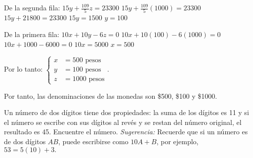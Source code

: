 \begin{myproof}
De la segunda fila: $15y + \frac{109}{5}z = 23300$
$15y + \frac{109}{5}(1000) = 23300$
$15y + 21800 = 23300$
$15y = 1500$
$y = 100$

De la primera fila: $10x + 10y - 6z = 0$
$10x + 10(100) - 6(1000) = 0$
$10x + 1000 - 6000 = 0$
$10x = 5000$
$x = 500$

Por lo tanto: $\begin{cases}
x &= 500 \text{ pesos}\\
y &= 100 \text{ pesos}\\
z &= 1000 \text{ pesos}
\end{cases}.$

Por tanto, las denominaciones de las monedas son \$500, \$100 y \$1000.
\end{myproof}


\begin{prob}
Un número de dos dígitos tiene dos propiedades: la suma de los dígitos es 11 y si el número se escribe con sus dígitos al revés y se restan del número original, el resultado es 45. Encuentre el número. \textit{Sugerencia:} Recuerde que si un número es de dos dígitos $AB$, puede escribirse como $10A+B$, por ejemplo, $53=5(10)+3.$
\end{prob}


